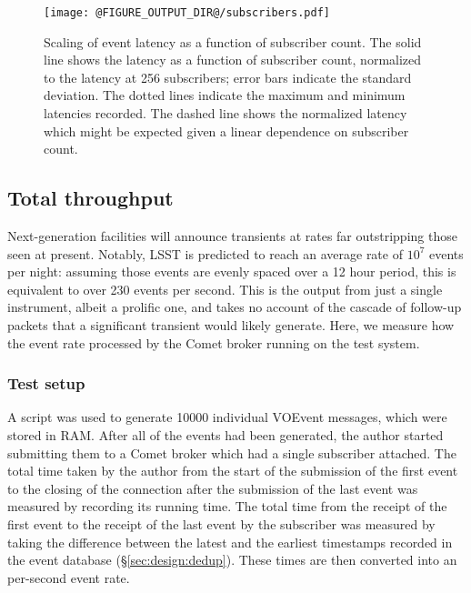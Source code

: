 \documentclass[5p,authoryear]{elsarticle}
\begin{document}
\begin{figure}
  \begin{center}
  \texttt{[image: @FIGURE\_OUTPUT\_DIR@/subscribers.pdf]}
  \end{center}

  \caption{Scaling of event latency as a function of subscriber count. The
  solid line shows the latency as a function of subscriber count, normalized
  to the latency at 256 subscribers; error bars indicate the standard
  deviation.  The dotted lines indicate the maximum and minimum latencies
  recorded. The dashed line shows the normalized latency which might be
  expected given a linear dependence on subscriber count.}

  \label{fig:subscribers}
\end{figure}


\subsection{Total throughput}
\label{sec:perf:total}

Next-generation facilities will announce transients at rates far outstripping
those seen at present. Notably, LSST is predicted to reach an average rate of
$10^7$ events per night: assuming those events are evenly spaced over a 12
hour period, this is equivalent to over 230 events per second. This is the
output from just a single instrument, albeit a prolific one, and takes no
account of the cascade of follow-up packets that a significant transient would
likely generate. Here, we measure how the event rate processed by the Comet
broker running on the test system.

\subsubsection{Test setup}
\label{sec:perf:total:setup}

A script was used to generate 10000 individual VOEvent messages, which were
stored in RAM\@. After all of the events had been generated, the author
started submitting them to a Comet broker which had a single subscriber
attached. The total time taken by the author from the start of the submission
of the first event to the closing of the connection after the submission of
the last event was measured by recording its running time. The total time from
the receipt of the first event to the receipt of the last event by the
subscriber was measured by taking the difference between the latest and the
earliest timestamps recorded in the event database (\S\ref{sec:design:dedup}).
These times are then converted into an per-second event rate.
\end{document}
